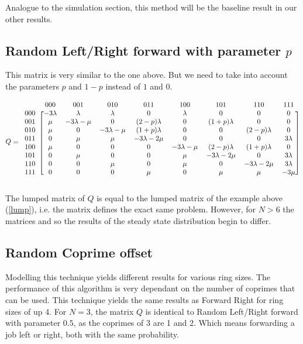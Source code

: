 \documentclass[10pt,a4paper,titlepage]{article}
\begin{document}

Analogue to the simulation section, this method will be the baseline result in our other results.

\subsection{Random Left/Right forward with parameter $p$}
This matrix is very similar to the one above. But we need to take into account the parameters $p$ and $1-p$ instead of $1$ and $0$.

\[ Q =
  \begin{blockarray}{ccccccccc}
    & 000 & 001 & 010 & 011 & 100 & 101 & 110 & 111 \\
    \begin{block}{c[cccccccc]}
    000 & -3 \lambda & \lambda & \lambda & 0 & \lambda & 0 & 0 & 0 \\
    001 & \mu & -3\lambda-\mu & 0 & (2-p)\lambda & 0 & (1+p)\lambda & 0 & 0 \\
    010 & \mu & 0 & -3\lambda-\mu & (1+p)\lambda & 0 & 0 & (2-p)\lambda & 0 \\
    011 & 0 & \mu & \mu & -3\lambda-2\mu & 0 & 0 & 0 & 3\lambda \\
    100 & \mu & 0 & 0 & 0 & -3\lambda-\mu & (2-p)\lambda & (1+p)\lambda & 0 \\
    101 & 0 & \mu & 0 & 0 & \mu & -3\lambda-2\mu & 0 & 3\lambda \\
    110 & 0 & 0 & \mu & 0 & \mu & 0 & -3\lambda-2\mu & 3\lambda \\
    111 & 0 & 0 & 0 & \mu & 0 & \mu & \mu & -3\mu \\
    \end{block}
  \end{blockarray}
\]

The lumped matrix of $Q$ is equal to the lumped matrix of the example above (\ref{lump}), i.e. the matrix defines the exact same problem. However, for $N > 6$ the matrices and so the results of the steady state distribution begin to differ.


\subsection{Random Coprime offset}
Modelling this technique yields different results for various ring sizes. The performance of this algorithm is very dependant on the number of coprimes that can be used. This technique yields the same results as Forward Right for ring sizes of up 4. For $N = 3$, the matrix $Q$ is identical to Random Left/Right forward with parameter $0.5$, as the coprimes of 3 are 1 and 2. Which means forwarding a job left or right, both with the same probability.
\end{document}
